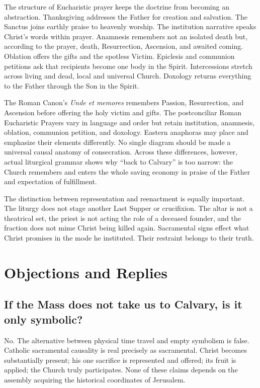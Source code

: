 \begin{deepstudy}
The structure of Eucharistic prayer keeps the doctrine from becoming an
abstraction. Thanksgiving addresses the Father for creation and salvation.
The Sanctus joins earthly praise to heavenly worship. The institution
narrative speaks Christ's words within prayer. Anamnesis remembers not an
isolated death but, according to the prayer, death, Resurrection, Ascension,
and awaited coming. Oblation offers the gifts and the spotless Victim.
Epiclesis and communion petitions ask that recipients become one body in the
Spirit. Intercessions stretch across living and dead, local and universal
Church. Doxology returns everything to the Father through the Son in the
Spirit.

The Roman Canon's \emph{Unde et memores} remembers Passion, Resurrection, and
Ascension before offering the holy victim and gifts. The postconciliar Roman
Eucharistic Prayers vary in language and order but retain institution,
anamnesis, oblation, communion petition, and doxology. Eastern anaphoras may
place and emphasize their elements differently. No single diagram should be
made a universal causal anatomy of consecration. Across these differences,
however, actual liturgical grammar shows why ``back to Calvary'' is too narrow:
the Church remembers and enters the whole saving economy in praise of the
Father and expectation of fulfillment.

The distinction between representation and reenactment is equally important.
The liturgy does not stage another Last Supper or crucifixion. The altar is not
a theatrical set, the priest is not acting the role of a deceased founder, and
the fraction does not mime Christ being killed again. Sacramental signs effect
what Christ promises in the mode he instituted. Their restraint belongs to
their truth.

\section{Objections and Replies}

\subsection*{If the Mass does not take us to Calvary, is it only symbolic?}

No. The alternative between physical time travel and empty symbolism is false.
Catholic sacramental causality is real precisely as sacramental. Christ becomes
substantially present; his one sacrifice is represented and offered; its fruit
is applied; the Church truly participates. None of these claims depends on the
assembly acquiring the historical coordinates of Jerusalem.


\end{deepstudy}
